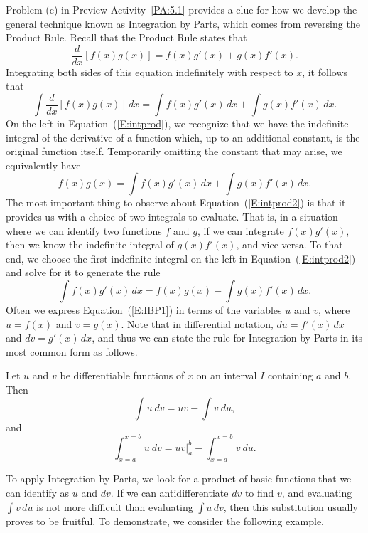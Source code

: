 Problem (c) in Preview Activity~\ref{PA:5.1} provides a clue for how we develop the general technique known as Integration by Parts, which comes from reversing the Product Rule.  Recall that the Product Rule states that
$$\frac{d}{dx} \left[ f(x) g(x) \right] = f(x) g'(x) + g(x)  f'(x).$$
Integrating both sides of this equation indefinitely with respect to $x$, it follows that
\begin{equation} \label{E:intprod}
\int \frac{d}{dx} \left[ f(x)  g(x) \right] \, dx = \int f(x) g'(x) \, dx + \int g(x)  f'(x) \, dx.
\end{equation}
On the left in Equation~(\ref{E:intprod}), we recognize that we have the indefinite integral of the derivative of a function which, up to an additional constant, is the original function itself.  Temporarily omitting the constant that may arise, we equivalently have 
\begin{equation} \label{E:intprod2}
f(x)  g(x) = \int f(x) g'(x) \, dx + \int g(x)  f'(x) \, dx.
\end{equation}
The most important thing to observe about Equation~(\ref{E:intprod2}) is that it provides us with a choice of two integrals to evaluate.  That is, in a situation where we can identify two functions $f$ and $g$, if we can integrate $f(x) g'(x)$, then we know the indefinite integral of $g(x) f'(x)$, and vice versa.  To that end, we choose the first indefinite integral on the left in Equation~(\ref{E:intprod2}) and solve for it to generate the rule
\begin{equation} \label{E:IBP1}
\int f(x) g'(x) \, dx  = f(x)  g(x) -  \int g(x)  f'(x) \, dx.
\end{equation}
Often we express Equation~(\ref{E:IBP1}) in terms of the variables $u$ and $v$, where $u = f(x)$ and $v = g(x)$.  Note that in differential notation, $du = f'(x) \, dx$ and $dv = g'(x) \, dx$, and thus we can state the rule for Integration by Parts in its most common form as follows.

{Let $u$ and $v$ be differentiable functions of $x$ on an interval $I$ containing $a$ and $b$. Then 
$$\int u\ dv = uv - \int v\ du,$$ and 
$$\int_{x=a}^{x=b} u\ dv = uv\Big|_a^b - \int_{x=a}^{x=b}v\ du.$$
} %

To apply Integration by Parts, we look for a product of basic functions that we can identify as $u$ and $dv$.  If we can antidifferentiate $dv$ to find $v$, and evaluating $\int v \, du$ is not more difficult than evaluating $\int u \, dv$, then this substitution usually proves to be fruitful.  To demonstrate, we consider the following example.

